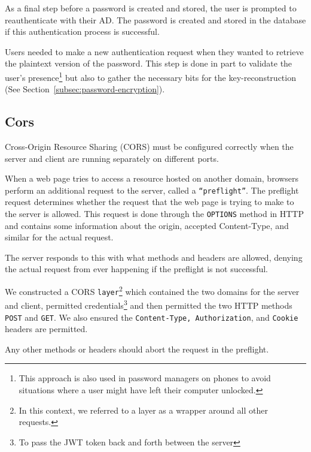 As a final step before a password is created and stored, the user is prompted to
reauthenticate with their AD\@.
The password is created and stored in the database if this authentication
process is successful.

Users needed to make a new authentication request when they wanted to retrieve
the plaintext version of the password.
This step is done in part to validate the user's presence\footnote{
  This approach is also used in password managers on phones to avoid situations
  where a user might have left their computer unlocked.
} but also to gather the necessary bits for the key-reconstruction
(See Section~\ref{subsec:password-encryption}).

\subsection{Cors}\label{subsec:cors}
Cross-Origin Resource Sharing (CORS) must be configured correctly when the
server and client are running separately on different ports.

When a web page tries to access a resource hosted on another domain, browsers
perform an additional request to the server, called a \texttt{``preflight''}.
The preflight request determines whether the
request that the web page is trying to make to the server is allowed.
This request is done through the \texttt{OPTIONS} method in HTTP and contains
some information about the origin, accepted Content-Type, and similar for the
actual request.

The server responds to this with what methods and headers are allowed, denying
the actual request from ever happening if the preflight is not successful.

We constructed a CORS \texttt{layer}\footnote{
  In this context, we referred to a layer as a wrapper around all other
  requests.
} which contained the two domains for the server and client, permitted
credentials\footnote{
  To pass the JWT token back and forth between the server
} and then permitted the two HTTP methods \texttt{POST} and \texttt{GET}.
We also ensured the \texttt{Content-Type, Authorization}, and \texttt{Cookie}
headers are permitted.

Any other methods or headers should abort the request in the preflight.

